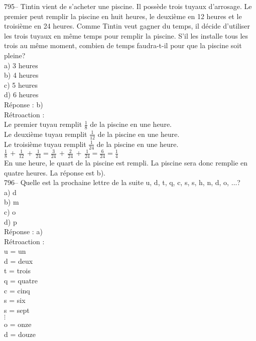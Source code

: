 ﻿\documentclass[letterpaper, 12pt]{article}
\begin{document}
795-- Tintin vient de s'acheter une piscine.  Il poss\`ede trois tuyaux
d'arrosage.  Le premier peut remplir la piscine en huit heures, le
deuxi\`eme en 12 heures et le troisi\`eme en 24 heures.  Comme Tintin veut
gagner du temps, il d\'ecide d'utiliser les trois tuyaux en m\^eme temps
pour remplir la piscine.  S'il les installe tous les trois au m\^eme moment,
combien de temps faudra-t-il pour que la piscine soit pleine?\\
a) 3 heures\\
b) 4 heures\\
c) 5 heures\\
d) 6 heures\\

R\'eponse : b)\\

R\'etroaction : \\
Le premier tuyau remplit $\frac{1}{8}$ de la piscine en une heure.\\[2mm]
Le deuxi\`eme tuyau remplit $\frac{1}{12}$ de la piscine en une
heure.\\[2mm]
Le troisi\`eme tuyau remplit $\frac{1}{24}$ de la piscine en une
heure.\\[2mm]
$\frac{1}{8}\,+\,\frac{1}{12}\,+\,\frac{1}{24}=\frac{3}{24}\,+\,\frac{2}{24}\,+\,\frac{1}{24}=\frac{6}{24}=\frac{1}{4}$\\[2mm]
En une heure, le quart de la piscine est rempli.  La piscine sera donc
remplie en quatre heures.  La r\'eponse est b).\\

796-- Quelle est la prochaine lettre de la suite u, d, t, q, c, s, s, h, n,
d, o, $\ldots$?\\
a) d\\
b) m\\
c) o\\
d) p\\

R\'eponse : a)\\

R\'etroaction : \\
u = un\\
d = deux\\
t = trois\\
q = quatre\\
c = cinq\\
s = six\\
s = sept\\
$\vdots$\\
o = onze\\
d = douze\\
\end{document}
